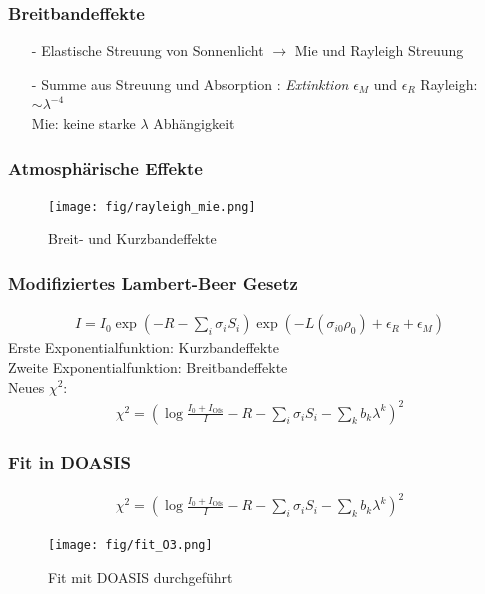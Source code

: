 \documentclass{beamer}
\begin{document}
\begin{frame}
    \frametitle{Breitbandeffekte}
    \begin{itemize}
        \item[-] Elastische Streuung von Sonnenlicht $\to$ Mie und Rayleigh Streuung
            \pause
        \item[-] Summe aus Streuung und Absorption : \textit{Extinktion} $\epsilon_M$ und $\epsilon_R$
            \pause
    Rayleigh: $\sim \lambda^{-4}$\\
    Mie: keine starke $\lambda$ Abhängigkeit
    \end{itemize}
\end{frame}

\begin{frame}
    \frametitle{Atmosphärische Effekte}
    \begin{figure}
    	\texttt{[image: fig/rayleigh\_mie.png]}
    	\caption{Breit- und Kurzbandeffekte \cite{platt10}}
    \end{figure}
\end{frame}

\begin{frame}
    \frametitle{Modifiziertes Lambert-Beer Gesetz}
    \begin{align}
        I = I_0 \exp(-R - \sum_i \sigma_i S_i) \exp\left( -L (\sigma_{i0}\rho_0) + \epsilon_R + \epsilon_M\right)
    \end{align}
    Erste Exponentialfunktion: Kurzbandeffekte\\
    Zweite Exponentialfunktion: Breitbandeffekte\\
    \pause
    Neues $\chi^2$:
    \begin{align}
        \chi^2 = \left( \log\frac{I_0 + I_\text{Ofs}}{I} - R - \sum_i \sigma_i S_i - \sum_k b_k \lambda^k \right)^2
    \end{align}
\end{frame}

\begin{frame}
    \frametitle{Fit in DOASIS}
    \vspace{-1cm}
    \begin{align}
        \chi^2 = \left( \log\frac{I_0 + I_\text{Ofs}}{I} - R - \sum_i \sigma_i S_i - \sum_k b_k \lambda^k \right)^2
    \end{align}
    \vspace{-1cm}
		\begin{figure}
        	\texttt{[image: fig/fit\_O3.png]}
            \caption{Fit mit DOASIS durchgeführt}
    	\end{figure}
\end{frame}
\end{document}
